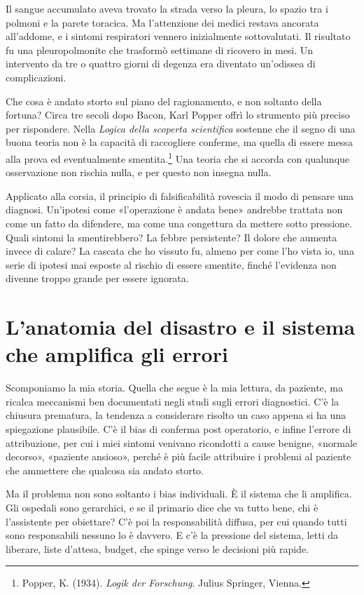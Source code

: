 Il sangue accumulato aveva trovato la strada verso la pleura, lo spazio tra i polmoni e la parete toracica. Ma l'attenzione dei medici restava ancorata all'addome, e i sintomi respiratori vennero inizialmente sottovalutati. Il risultato fu una pleuropolmonite che trasform\`{o} settimane di ricovero in mesi. Un intervento da tre o quattro giorni di degenza era diventato un'odissea di complicazioni.

Che cosa \`{e} andato storto sul piano del ragionamento, e non soltanto della fortuna? Circa tre secoli dopo Bacon, Karl Popper offr\`{i} lo strumento pi\`{u} preciso per rispondere. Nella \textit{Logica della scoperta scientifica} sostenne che il segno di una buona teoria non \`{e} la capacit\`{a} di raccogliere conferme, ma quella di essere messa alla prova ed eventualmente smentita.\footnote{Popper, K. (1934). \textit{Logik der Forschung}. Julius Springer, Vienna.} Una teoria che si accorda con qualunque osservazione non rischia nulla, e per questo non insegna nulla.

Applicato alla corsia, il principio di falsificabilit\`{a} rovescia il modo di pensare una diagnosi. Un'ipotesi come «l'operazione \`{e} andata bene» andrebbe trattata non come un fatto da difendere, ma come una congettura da mettere sotto pressione. Quali sintomi la smentirebbero? La febbre persistente? Il dolore che aumenta invece di calare? La cascata che ho vissuto fu, almeno per come l'ho vista io, una serie di ipotesi mai esposte al rischio di essere smentite, finch\'{e} l'evidenza non divenne troppo grande per essere ignorata.

\section{L'anatomia del disastro e il sistema che amplifica gli errori}

Scomponiamo la mia storia. Quella che segue \`{e} la mia lettura, da paziente, ma ricalca meccanismi ben documentati negli studi sugli errori diagnostici. C'\`{e} la chiusura prematura, la tendenza a considerare risolto un caso appena si ha una spiegazione plausibile. C'\`{e} il bias di conferma post operatorio, e infine l'errore di attribuzione, per cui i miei sintomi venivano ricondotti a cause benigne, «normale decorso», «paziente ansioso», perch\'{e} \`{e} pi\`{u} facile attribuire i problemi al paziente che ammettere che qualcosa sia andato storto.

Ma il problema non sono soltanto i bias individuali. \`{E} il sistema che li amplifica. Gli ospedali sono gerarchici, e se il primario dice che va tutto bene, chi \`{e} l'assistente per obiettare? C'\`{e} poi la responsabilit\`{a} diffusa, per cui quando tutti sono responsabili nessuno lo \`{e} davvero. E c'\`{e} la pressione del sistema, letti da liberare, liste d'attesa, budget, che spinge verso le decisioni pi\`{u} rapide.

